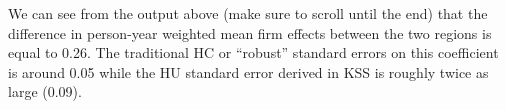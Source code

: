 \documentclass[11pt]{article}
\begin{document}
    We can see from the output above (make sure to scroll until the end)
that the difference in person-year weighted mean firm effects between
the two regions is equal to 0.26. The traditional
HC or ``robust'' standard errors on this
coefficient is around 0.05 while the HU standard error derived in KSS is
roughly twice as large (0.09).


    
    
    
\end{document}
